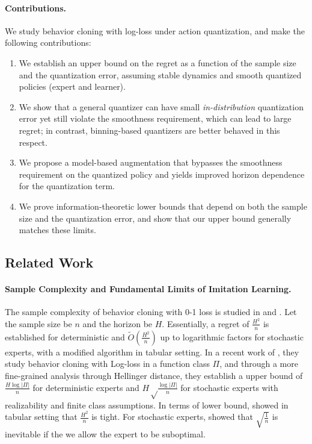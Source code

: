 \documentclass{article}
\let\oldparagraph\paragraph
\renewcommand{\paragraph}[1]{\oldparagraph{#1.}}
\begin{document}
\paragraph{Contributions}
We study behavior cloning with log-loss \citep{foster2024behavior} under action quantization, and make the following contributions: 
\begin{enumerate}
    \item We establish an upper bound on the regret as a function of the sample size  and the quantization error, assuming stable dynamics and smooth quantized policies (expert and learner).
    \item We show that a general quantizer can have small \emph{in-distribution} quantization error yet still violate the smoothness requirement, which can lead to large regret; in contrast, binning-based quantizers are better behaved in this respect.
    \item We propose a model-based augmentation that bypasses the smoothness requirement on the quantized policy and yields improved horizon dependence for the quantization term.
    \item We prove information-theoretic lower bounds that depend on both the sample size and the quantization error, and show that our upper bound generally matches these limits.
\end{enumerate}


\subsection{Related Work}
\paragraph{Sample Complexity and Fundamental Limits of Imitation Learning}
The sample complexity of behavior cloning with 0-1 loss is studied in \citet{ross2011reduction} and \citet{rajaraman2020toward}. Let the sample size be $n$ and the horizon be $H$. Essentially, a regret of $\frac{H^2}{n}$ is established for deterministic and $\tilde O(\frac{H^2}{n})$ up to
logarithmic factors for stochastic experts, with a modified algorithm in tabular setting. In a recent work of \citet{foster2024behavior}, they study behavior cloning with Log-loss in a function class $\Pi$, and through a more fine-grained analysis through Hellinger distance, they establish a upper bound of $\frac{H\log|\Pi|}{n}$ for deterministic experts and $H\sqrt\frac{\log|\Pi|}{ n}$ for stochastic experts with realizability and finite class  assumptions. In terms of lower bound, \citet{rajaraman2020toward} showed in tabular setting that $\frac{H^2}{n}$ is tight. For stochastic experts, \citet{foster2024behavior} showed that $\sqrt{\frac{1}{n}}$ is inevitable if the we allow the expert to be suboptimal.
\end{document}
